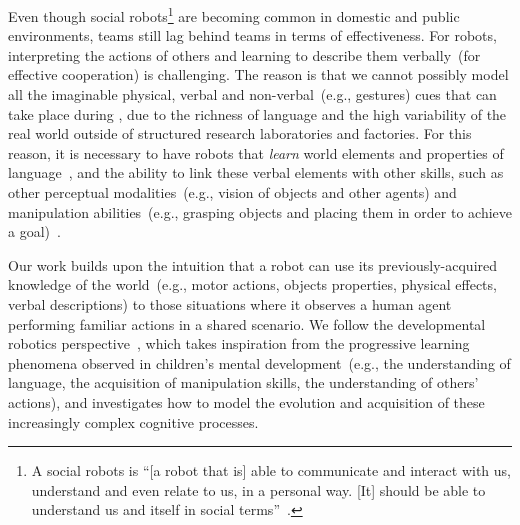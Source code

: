 Even though social robots\footnote{A social robots is ``[a robot that is] able to communicate and interact with us, understand and even relate to us, in a personal way. [It] should be able to understand us and itself in social terms''~\cite{breazeal:2002:dsr}.} are becoming common in domestic and public environments, \hr{} teams still lag behind \hh{} teams in terms of effectiveness.
For robots, interpreting the actions of others and learning to describe them verbally~(for effective cooperation) is challenging.
The reason is that we cannot possibly model all the imaginable physical, verbal and non-verbal~(e.g., gestures) cues that can take place during \hri, due to the richness of language and the high variability of the real world outside of structured research laboratories and factories.
For this reason, it is necessary to have robots that \emph{learn} world elements and properties of language~\cite{iwahashi:2007:hri}, and the ability to link these verbal elements with other skills, such as other perceptual modalities~(e.g., vision of objects and other agents) and manipulation abilities~(e.g., grasping objects and placing them in order to achieve a goal)~\cite{steels:2003:trendscogsci}.

Our work builds upon the intuition that a robot can use its previously-acquired knowledge of the world~(e.g., motor actions, objects properties, physical effects, verbal descriptions) to those situations where it observes a human agent performing familiar actions in a shared \hr{} scenario.
We follow the developmental robotics perspective~\cite{lungarella:2003:devrobsurvey,cangelosi:2015:devrobbook},
which takes inspiration from the progressive learning phenomena observed in children's mental development~(e.g., the understanding of language, the acquisition of manipulation skills, the understanding of others' actions), and investigates how to model the evolution and acquisition of these increasingly complex cognitive processes.

